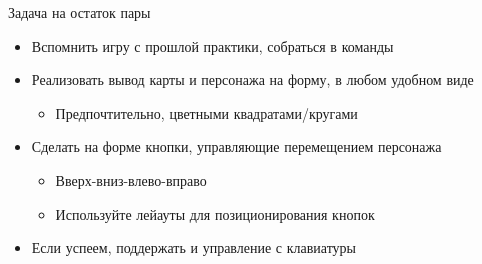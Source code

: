 \documentclass{../../slides-style}
\begin{document}
    \begin{frame}{Задача на остаток пары}
        \begin{itemize}
            \item Вспомнить игру с прошлой практики, собраться в команды
            \item Реализовать вывод карты и персонажа на форму, в любом удобном виде
            \begin{itemize}
                \item Предпочтительно, цветными квадратами/кругами
            \end{itemize}
            \item Сделать на форме кнопки, управляющие перемещением персонажа
            \begin{itemize}
                \item Вверх-вниз-влево-вправо
                \item Используйте лейауты для позиционирования кнопок
            \end{itemize}
            \item Если успеем, поддержать и управление с клавиатуры
        \end{itemize}
    \end{frame}
\end{document}

